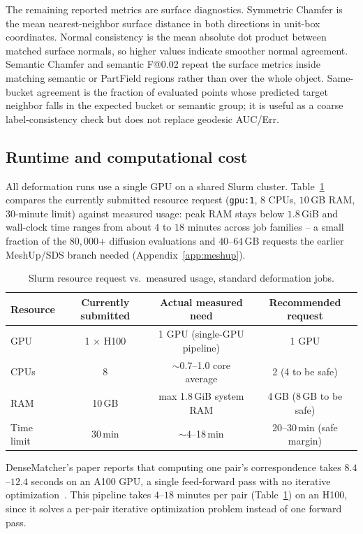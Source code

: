 \documentclass{article}
\makeatletter
\newcommand{\Fscore}{F@0.02}
\newcommand{\Chamfer}{Chamfer}
\makeatother
\begin{document}
The remaining reported metrics are surface diagnostics. Symmetric \Chamfer{} is the mean
nearest-neighbor surface distance in both directions in unit-box coordinates. Normal consistency is
the mean absolute dot product between matched surface normals, so higher values indicate smoother
normal agreement. Semantic \Chamfer{} and semantic \Fscore{} repeat the surface metrics inside
matching semantic or PartField regions rather than over the whole object. Same-bucket agreement is
the fraction of evaluated points whose predicted target neighbor falls in the expected bucket or
semantic group; it is useful as a coarse label-consistency check but does not replace geodesic
AUC/Err.

\subsection{Runtime and computational cost}
\label{sec:runtime}

All deformation runs use a single GPU on a shared Slurm cluster. Table~\ref{tab:runtime} compares
the currently submitted resource request (\texttt{gpu:1}, $8$ CPUs, $10$\,GB RAM, $30$-minute
limit) against measured usage: peak RAM stays below $1.8$\,GiB and wall-clock time ranges from
about $4$ to $18$ minutes across job families -- a small fraction of the $80{,}000$+ diffusion
evaluations and $40$--$64$\,GB requests the earlier MeshUp/SDS branch needed
(Appendix~\ref{app:meshup}).

\begin{table}[H]
\centering
\small
\begin{tabular}{lccc}
\toprule
Resource & Currently submitted & Actual measured need & Recommended request \\
\midrule
GPU & 1 $\times$ H100 & 1 GPU (single-GPU pipeline) & 1 GPU \\
CPUs & 8 & $\sim$0.7--1.0 core average & 2 (4 to be safe) \\
RAM & 10\,GB & max 1.8\,GiB system RAM & 4\,GB (8\,GB to be safe) \\
Time limit & 30\,min & $\sim$4--18\,min & 20--30\,min (safe margin) \\
\bottomrule
\end{tabular}
\caption{Slurm resource request vs.\ measured usage, standard deformation jobs.}
\label{tab:runtime}
\end{table}

DenseMatcher's paper reports that computing one pair's correspondence takes $8.4$--$12.4$ seconds
on an A100 GPU, a single feed-forward pass with no iterative
optimization~\cite{densematcher}. This pipeline takes $4$--$18$ minutes per pair
(Table~\ref{tab:runtime}) on an H100, since it solves a per-pair iterative optimization
problem instead of one forward pass.
\end{document}
